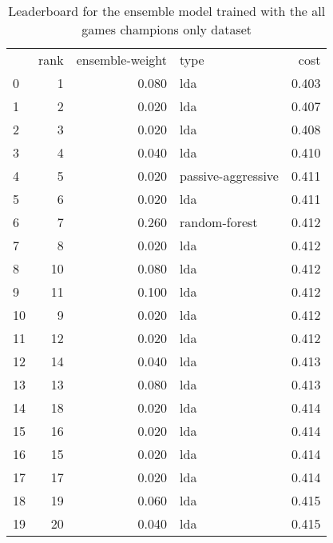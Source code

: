 
\begin{table}[]
	\centering
	\begin{tabular}{lrrlr}
		   & rank & ensemble-weight & type               & cost  \\
		0  & 1    & 0.080           & lda                & 0.403 \\
		1  & 2    & 0.020           & lda                & 0.407 \\
		2  & 3    & 0.020           & lda                & 0.408 \\
		3  & 4    & 0.040           & lda                & 0.410 \\
		4  & 5    & 0.020           & passive-aggressive & 0.411 \\
		5  & 6    & 0.020           & lda                & 0.411 \\
		6  & 7    & 0.260           & random-forest      & 0.412 \\
		7  & 8    & 0.020           & lda                & 0.412 \\
		8  & 10   & 0.080           & lda                & 0.412 \\
		9  & 11   & 0.100           & lda                & 0.412 \\
		10 & 9    & 0.020           & lda                & 0.412 \\
		11 & 12   & 0.020           & lda                & 0.412 \\
		12 & 14   & 0.040           & lda                & 0.413 \\
		13 & 13   & 0.080           & lda                & 0.413 \\
		14 & 18   & 0.020           & lda                & 0.414 \\
		15 & 16   & 0.020           & lda                & 0.414 \\
		16 & 15   & 0.020           & lda                & 0.414 \\
		17 & 17   & 0.020           & lda                & 0.414 \\
		18 & 19   & 0.060           & lda                & 0.415 \\
		19 & 20   & 0.040           & lda                & 0.415 \\
	\end{tabular}

	\caption{Leaderboard for the ensemble model trained with the all games champions only dataset}
	\label{tab:lb-all-games-champs-only}
\end{table}

